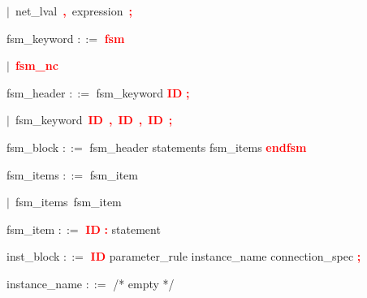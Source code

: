 \mbox{$|$ net\_lval \textbf{\textcolor{red}{,}} expression \textbf{\textcolor{red}{;}}}

\vspace{1em}
\noindent
\settowidth{\parindent}{\hspace{4ex}}
fsm\_keyword $::=$\hspace{1ex} \textbf{\textcolor{red}{fsm}}

\mbox{$|$ \textbf{\textcolor{red}{fsm\_nc}}}

\vspace{1em}
\noindent
\settowidth{\parindent}{\hspace{4ex}}
fsm\_header $::=$\hspace{1ex} fsm\_keyword \textbf{\textcolor{red}{ID}} \textbf{\textcolor{red}{;}}

\mbox{$|$ fsm\_keyword \textbf{\textcolor{red}{ID}} \textbf{\textcolor{red}{,}} \textbf{\textcolor{red}{ID}} \textbf{\textcolor{red}{,}} \textbf{\textcolor{red}{ID}} \textbf{\textcolor{red}{;}}}

\vspace{1em}
\noindent
\settowidth{\parindent}{\hspace{4ex}}
fsm\_block $::=$\hspace{1ex} fsm\_header statements fsm\_items \textbf{\textcolor{red}{endfsm}}

\vspace{1em}
\noindent
\settowidth{\parindent}{\hspace{4ex}}
fsm\_items $::=$\hspace{1ex} fsm\_item

\mbox{$|$ fsm\_items fsm\_item}

\vspace{1em}
\noindent
\settowidth{\parindent}{\hspace{4ex}}
fsm\_item $::=$\hspace{1ex} \textbf{\textcolor{red}{ID}} \textbf{\textcolor{red}{:}} statement

\vspace{1em}
\noindent
\settowidth{\parindent}{\hspace{4ex}}
inst\_block $::=$\hspace{1ex} \textbf{\textcolor{red}{ID}} parameter\_rule instance\_name connection\_spec \textbf{\textcolor{red}{;}}

\vspace{1em}
\noindent
\settowidth{\parindent}{\hspace{4ex}}
instance\_name $::=$\hspace{1ex} /* empty */

